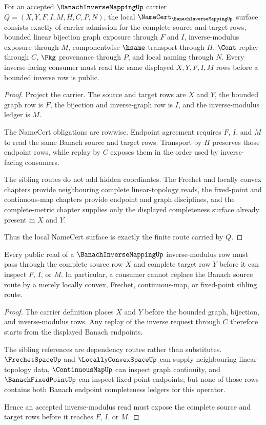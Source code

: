 \begin{theorem}
\label{thm:banach-inverse-mapping-namecert-obligations}
For an accepted $\BanachInverseMappingUp$ carrier $Q=(X,Y,F,I,M,H,C,P,N)$, the local $\NameCert_{\BanachInverseMappingUp}$ surface consists exactly of carrier admission for the complete source and target rows, bounded linear bijection graph exposure through $F$ and $I$, inverse-modulus exposure through $M$, componentwise $\hsame$ transport through $H$, $\Cont$ replay through $C$, $\Pkg$ provenance through $P$, and local naming through $N$. Every inverse-facing consumer must read the same displayed $X,Y,F,I,M$ rows before a bounded inverse row is public.
\end{theorem}
\begin{proof}
Project the carrier. The source and target rows are $X$ and $Y$, the bounded graph row is $F$, the bijection and inverse-graph row is $I$, and the inverse-modulus ledger is $M$.

The NameCert obligations are rowwise. Endpoint agreement requires $F$, $I$, and $M$ to read the same Banach source and target rows. Transport by $H$ preserves those endpoint rows, while replay by $C$ exposes them in the order used by inverse-facing consumers.

The sibling routes do not add hidden coordinates. The Frechet and locally convex chapters provide neighbouring complete linear-topology reads, the fixed-point and continuous-map chapters provide endpoint and graph disciplines, and the complete-metric chapter supplies only the displayed completeness surface already present in $X$ and $Y$.

Thus the local NameCert surface is exactly the finite route carried by $Q$.
\end{proof}

\begin{theorem}
\label{thm:banach-inverse-mapping-complete-source-route}
Every public read of a $\BanachInverseMappingUp$ inverse-modulus row must pass through the complete source row $X$ and complete target row $Y$ before it can inspect $F$, $I$, or $M$. In particular, a consumer cannot replace the Banach source route by a merely locally convex, Frechet, continuous-map, or fixed-point sibling route.
\end{theorem}
\begin{proof}
The carrier definition places $X$ and $Y$ before the bounded graph, bijection, and inverse-modulus rows. Any replay of the inverse request through $C$ therefore starts from the displayed Banach endpoints.

The sibling references are dependency routes rather than substitutes. $\FrechetSpaceUp$ and $\LocallyConvexSpaceUp$ can supply neighbouring linear-topology data, $\ContinuousMapUp$ can inspect graph continuity, and $\BanachFixedPointUp$ can inspect fixed-point endpoints, but none of those rows contains both Banach endpoint completeness ledgers for this operator.

Hence an accepted inverse-modulus read must expose the complete source and target rows before it reaches $F$, $I$, or $M$.
\end{proof}

